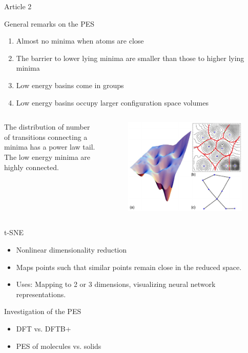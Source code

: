 \documentclass{beamer}
\begin{document}
\begin{frame}{Article 2}
\begin{block}{General remarks on the PES}
	\begin{enumerate}
		\item Almost no minima when atoms are close
		\item The barrier to lower lying minima are smaller than those to higher lying minima
		\item Low energy basins come in groups
		\item Low energy basins occupy larger configuration space volumes
	\end{enumerate}
	\begin{columns}
		The distribution of number of transitions connecting a minima has a power law tail.
		\bigskip
		The low energy minima are highly connected.
		
		\begin{figure}
			\centering
			\includegraphics[width=0.9\linewidth]{PESasNetwork}
			\caption{}
			\label{fig:pesasnetwork}
		\end{figure}
		
	\end{columns}
\end{block}
\end{frame}

\begin{frame}{t-SNE}
\begin{itemize}
	\item Nonlinear dimensionality reduction 
	\item Maps points such that similar points remain close in the reduced space.
	\item Uses: Mapping to 2 or 3 dimensions, visualizing neural network representations.
\end{itemize}

\begin{block}{Investigation of the PES}
	\begin{itemize}
	\item DFT vs. DFTB+ 
	\item PES of molecules vs. solids
\end{itemize}
\end{block}

\end{frame}
\end{document}
